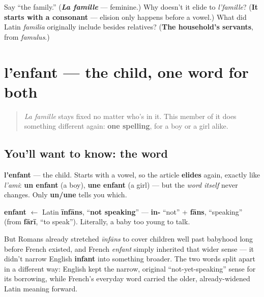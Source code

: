 \begin{tcolorbox}[breakable,colback=teal!4,colframe=teal!35!black,title={Before you move on}]
Say \textquotedblleft{}the family.\textquotedblright{} (\emph{\textbf{La famille}} — feminine.) Why doesn't it elide to \emph{l'famille}? (\textbf{It starts with a consonant} — elision only happens before a vowel.) What did Latin \emph{familia} originally include besides relatives? (\textbf{The household's servants}, from \emph{famulus}.)
\end{tcolorbox}
\section[l'enfant]{l'enfant — the child, one word for both}

\label{lesson:FR-C29-enfant}



\begin{quote}
\emph{La famille} stays fixed no matter who's in it. This member of it does something different again: \textbf{one spelling}, for a boy or a girl alike.
\end{quote}

\subsection*{You'll want to know: the word}
\textbf{l'enfant} — the child. Starts with a vowel, so the article \textbf{elides} again, exactly like \emph{l'ami}: \textbf{un enfant} (a boy), \textbf{une enfant} (a girl) — but the \emph{word itself} never changes. Only \textbf{un/une} tells you which.

\begin{cousinweb}
\textbf{enfant} $\leftarrow$ Latin \textbf{īnfāns}, \textquotedblleft{}\textbf{not speaking}\textquotedblright{} — \textbf{in-} \textquotedblleft{}not\textquotedblright{} + \textbf{fāns}, \textquotedblleft{}speaking\textquotedblright{} (from \textbf{fārī}, \textquotedblleft{}to speak\textquotedblright{}). Literally, a baby too young to talk.

But Romans already stretched \emph{īnfāns} to cover children well past babyhood long before French existed, and French \emph{enfant} simply inherited that wider sense — it didn't narrow English \textbf{infant} into something broader. The two words split apart in a different way: English kept the narrow, original \textquotedblleft{}not-yet-speaking\textquotedblright{} sense for its borrowing, while French's everyday word carried the older, already-widened Latin meaning forward.
\end{cousinweb}

